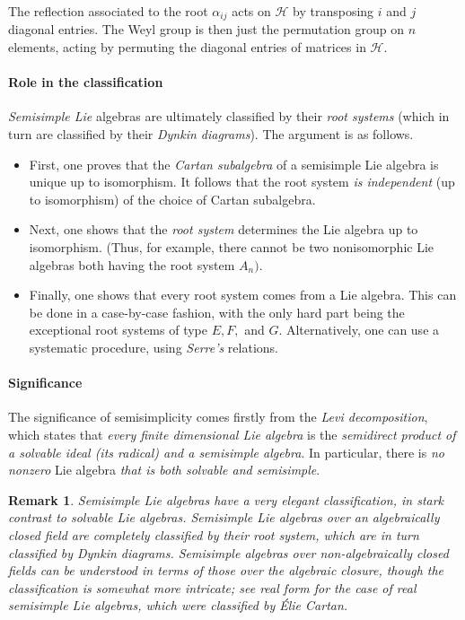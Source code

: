 \documentclass[aps,preprint]{revtex4}%
\newtheorem{remark}[theorem]{Remark}
\begin{document}
The reflection associated to the root $\alpha_{ij}$ acts on $\mathcal{H}$ by
transposing $i$ and $j$ diagonal entries. The Weyl group is then just the
permutation group on $n$ elements, acting by permuting the diagonal entries of
matrices in $\mathcal{H}$.

\paragraph{Role in the classification}

\emph{Semisimple Lie} algebras are ultimately classified by their \emph{root
systems} (which in turn are classified by their \emph{Dynkin diagrams}). The
argument is as follows.

\begin{itemize}
\item First, one proves that the \emph{Cartan subalgebra} of a semisimple Lie
algebra is unique up to isomorphism. It follows that the root system \emph{is
independent} (up to isomorphism) of the choice of Cartan subalgebra.

\item Next, one shows that the \emph{root system} determines the Lie algebra
up to isomorphism. (Thus, for example, there cannot be two nonisomorphic Lie
algebras both having the root system $A_{n}).$

\item Finally, one shows that every root system comes from a Lie algebra. This
can be done in a case-by-case fashion, with the only hard part being the
exceptional root systems of type $E,F,$ and $G$. Alternatively, one can use a
systematic procedure, using \emph{Serre's} relations.
\end{itemize}

\paragraph{Significance}

The significance of semisimplicity comes firstly from the \emph{Levi
decomposition}, which states that \emph{every finite dimensional Lie algebra}
is the \emph{semidirect product of a solvable ideal (its radical) and a
semisimple algebra}. In particular, there is \emph{no nonzero} Lie algebra
\emph{that is both solvable and semisimple}.

\begin{remark}
Semisimple Lie algebras have a very elegant classification, in stark contrast
to solvable Lie algebras. Semisimple Lie algebras over an algebraically closed
field are completely classified by their root system, which are in turn
classified by Dynkin diagrams. Semisimple algebras over non-algebraically
closed fields can be understood in terms of those over the algebraic closure,
though the classification is somewhat more intricate; see real form for the
case of real semisimple Lie algebras, which were classified by \'{E}lie Cartan.
\end{remark}
\end{document}
